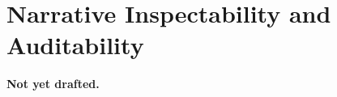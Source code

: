 \section{Narrative Inspectability and Auditability}
\label{sec:auditability}


\textbf{Not yet drafted.}
